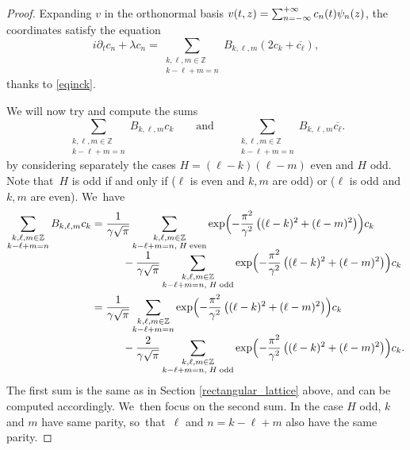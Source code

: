 \documentclass[10pt]{amsart}
\theoremstyle{definition}
\let\EE\exp
\let\dis\relax
\let\ov\overline
\newcommand\Z{\mathbb Z}
\newcommand{\pa}[1]{\left(#1\right)}
\begin{document}
\begin{proof}
Expanding $v$ in the orthonormal basis $\dis v(t,z)=\sum_{n=-\infty}^{+\infty} c_n(t)\psi_n(z)$, the coordinates satisfy the equation
\begin{equation}\label{Lin_coeff_hexa}
i\partial_t c_n + \lambda c_n = \sum_{\substack {k, \ell, m \in \Z\\ k-\ell+m=n}}B_{k,\ell,m}(2c_{k} + \ov{c_{\ell}}),
\end{equation}
thanks to \eqref{eqinck}.

We will now try and compute the sums\vspace*{-3pt}
\[
\sum_{\substack {k, \ell, m\in \Z\\ k-\ell+m=n}}B_{k,\ell,m}c_{k} \qquad \text{and} \qquad \sum_{\substack {k, \ell, m \in \Z\\ k-\ell+m=n}}B_{k,\ell,m}\ov{c_{\ell}}.
\]
by considering separately the cases $H=(\ell-k)(\ell-m)$ even and $H$ odd. Note that~$H$ is odd if and only if ($\ell$ is even and $k,m$ are odd) or ($\ell$ is odd and $k,m$ are even). We~have\vspace*{-5pt}\enlargethispage{.5\baselineskip}
\begin{align*}
\sum_{\substack {k, \ell, m \in \Z\\ k-\ell+m=n}}B_{k,\ell,m}c_{k} &= \frac{1}{\gamma\sqrt{\pi}}\sum_{\substack {k, \ell, m \in \Z\\ k-\ell+m=n, \; H\; \text{even}}}\EE\Bigl({-\frac{\pi^2}{\gamma^2}\pa{(\ell-k)^2+(\ell-m)^2}}\Bigr)c_{k} \\[-5pt]
&\hspace{1cm}- \frac{1}{\gamma\sqrt{\pi}}\sum_{\substack {k, \ell, m \in \Z\\ k-\ell+m=n, \; H\; \text{odd}}}\EE\Bigl({-\frac{\pi^2}{\gamma^2}\pa{(\ell-k)^2+(\ell-m)^2}}\Bigr)c_{k} \\
&= \frac{1}{\gamma\sqrt{\pi}}\sum_{\substack {k, \ell, m \in \Z \\ k-\ell+m=n }}\EE\Bigl({-\frac{\pi^2}{\gamma^2}\pa{(\ell-k)^2+(\ell-m)^2}}\Bigr)c_{k} \\[-3pt]
&\hspace{1cm} - \frac{2}{\gamma\sqrt{\pi}}\sum_{\substack {k, \ell, m \in \Z\\ k-\ell+m=n, \; H\; \text{odd}}}\EE\Bigl({-\frac{\pi^2}{\gamma^2}\pa{(\ell-k)^2+(\ell-m)^2}}\Bigr)c_{k}.
\end{align*}
The first sum is the same as in Section \ref{rectangular_lattice} above, and can be computed accordingly. We~then focus on the second sum. In the case $H$ odd, $k$ and $m$ have same parity, so~that~$\ell$ and $n=k-\ell+m$ also have the same parity.


\end{proof}
\end{document}
